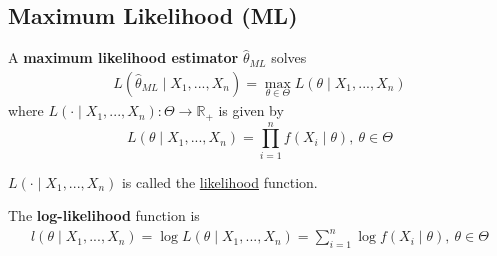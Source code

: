\documentclass[11pt]{elegantbook}
\begin{document}
\subsection{Maximum Likelihood (ML)}
\begin{definition}
    \normalfont
    A \textbf{maximum likelihood estimator} $\hat{\theta}_{ML}$ solves
    \begin{equation}
        \begin{aligned}
            L(\hat{\theta}_{ML}\mid X_1,...,X_n)=\max_{\theta\in\Theta} L(\theta\mid X_1,...,X_n)
        \end{aligned}
        \nonumber
    \end{equation}
    where $L(\cdot\mid X_1,...,X_n):\Theta \rightarrow \mathbb{R}_+$ is given by $$L(\theta\mid X_1,...,X_n)=\prod_{i=1}^n f(X_i\mid\theta),\ \theta\in\Theta$$
\end{definition}
\begin{remark}
    $L(\cdot\mid X_1,...,X_n)$ is called the \underline{likelihood} function.
\end{remark}
\begin{definition}
    \normalfont
    The \textbf{log-likelihood} function is
    \begin{equation}
        \begin{aligned}
            l(\theta\mid X_1,...,X_n)=\log L(\theta\mid X_1,...,X_n)=\sum_{i=1}^n \log f(X_i\mid\theta),\ \theta\in\Theta
        \end{aligned}
        \nonumber
    \end{equation}
\end{definition}
\end{document}
